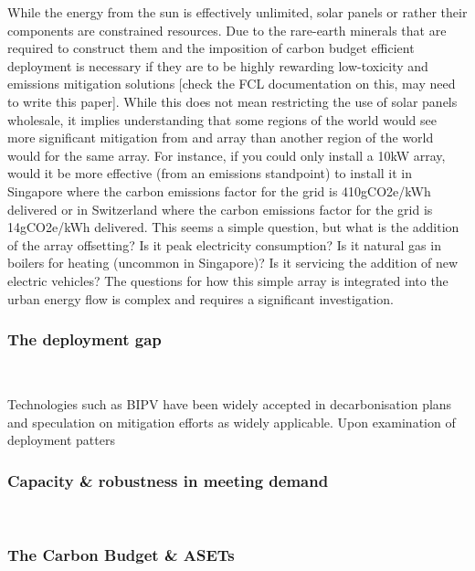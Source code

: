 While the energy from the sun is effectively unlimited, solar panels or rather their components are constrained resources. Due to the rare-earth minerals that are required to construct them and the imposition of carbon budget efficient deployment is necessary if they are to be highly rewarding low-toxicity and emissions mitigation solutions [check the FCL documentation on this, may need to write this paper]. While this does not mean restricting the use of solar panels wholesale, it implies understanding that some regions of the world would see more significant mitigation from and array than another region of the world would for the same array. For instance, if you could only install a 10kW array, would it be more effective (from an emissions standpoint) to install it in Singapore where the carbon emissions factor for the grid is 410gCO2e/kWh delivered or in Switzerland where the carbon emissions factor for the grid is 14gCO2e/kWh delivered. This seems a simple question, but what is the addition of the array offsetting? Is it peak  electricity consumption? Is it natural gas in boilers for heating (uncommon in Singapore)? Is it servicing the addition of new electric vehicles? The questions for how this simple array is integrated into the urban energy flow is complex and requires a significant investigation.

\subsubsection{The deployment gap}\

Technologies such as BIPV have been widely accepted in decarbonisation plans and speculation on mitigation efforts as widely applicable. Upon examination of deployment patters 

\vspace{2cm}


\subsubsection{Capacity \& robustness in meeting demand}\

\vspace{2cm}


\subsubsection{The Carbon Budget \& ASETs}\

\vspace{2cm}


